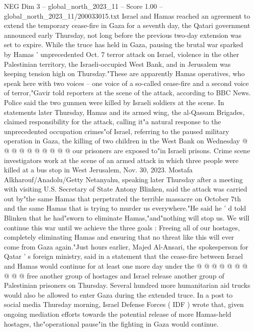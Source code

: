 \begin{textsample}{NEG Dim 3 – global\_north\_2023\_11 – Score 1.00 – global\_north\_2023\_11/200033015.txt}  \label{ex:f3_neg_273}
Israel and Hamas reached an agreement to extend the temporary cease-fire in Gaza for a seventh day, the Qatari government announced early Thursday, not long before the previous two-day extension was set to expire.
While the truce has held in Gaza, pausing the brutal war sparked by Hamas ' unprecedented Oct. 7 terror attack on Israel, violence in the other Palestinian territory, the Israeli-occupied West Bank, and in Jerusalem was keeping tension high on Thursday."These are apparently Hamas operatives, who speak here with two voices -- one voice of a so-called cease-fire and a second voice of terror,"Gavir told reporters at the scene of the attack, according to BBC News.
Police said the two gunmen were killed by Israeli soldiers at the scene.
In statements later Thursday, Hamas and its armed wing, the al-Qassam Brigades, claimed responsibility for the attack, calling it"a natural response to the unprecedented occupation crimes"of Israel, referring to the paused military operation in Gaza, the killing of two children in the West Bank on Wednesday @ @ @ @ @ @ @ @ @ @ our prisoners are exposed to"in Israeli prisons.
Crime scene investigators work at the scene of an armed attack in which three people were killed at a bus stop in West Jerusalem, Nov. 30, 2023.
Mostafa Alkharouf/Anadolu/Getty Netanyahu, speaking later Thursday after a meeting with visiting U.S.
Secretary of State Antony Blinken, said the attack was carried out by"the same Hamas that perpetrated the terrible massacre on October 7th and the same Hamas that is trying to murder us everywhere."He said he ' d told Blinken that he had"sworn to eliminate Hamas,"and"nothing will stop us.
We will continue this war until we achieve the three goals : Freeing all of our hostages, completely eliminating Hamas and ensuring that no threat like this will ever come from Gaza again."Just hours earlier, Majed Al-Ansari, the spokesperson for Qatar ' s foreign ministry, said in a statement that the cease-fire between Israel and Hamas would continue for at least one more day under the @ @ @ @ @ @ @ @ @ @ free another group of hostages and Israel release another group of Palestinian prisoners on Thursday.
Several hundred more humanitarian aid trucks would also be allowed to enter Gaza during the extended truce.
In a post to social media Thursday morning, Israel Defense Forces ( IDF ) wrote that, given ongoing mediation efforts towards the potential release of more Hamas-held hostages, the"operational pause"in the fighting in Gaza would continue.

\end{textsample}

